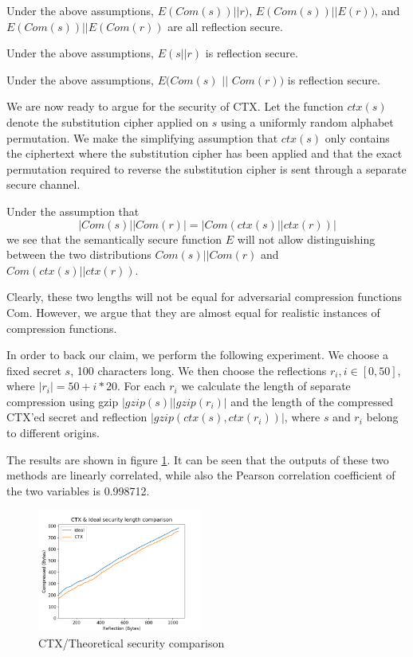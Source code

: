 \begin{lemma}
    Under the above assumptions, $E(Com(s)) || r)$, \break$E(Com(s)) || E(r))$, and
    $E(Com(s)) || E(Com(r))$ are all reflection secure.
\end{lemma}

\begin{lemma}
    Under the above assumptions, $E(s || r)$ is reflection secure.
\end{lemma}

\begin{lemma}
    Under the above assumptions, $E(Com(s)$ $||$ $Com(r))$ is reflection secure.
\end{lemma}

We are now ready to argue for the security of CTX. Let the function $ctx(s)$
denote the substitution cipher applied on $s$ using a uniformly random alphabet
permutation. We make the simplifying assumption that $ctx(s)$ only contains the
ciphertext where the substitution cipher has been applied and that the exact
permutation required to reverse the substitution cipher is sent through a
separate secure channel.

Under the assumption that \[|Com(s) || Com(r)| = |Com(ctx(s) || ctx(r))|\] we
see that the semantically secure function $E$ will not allow distinguishing
between the two distributions $Com(s) || Com(r)$ and $Com(ctx(s) || ctx(r))$.

Clearly, these two lengths will not be equal for adversarial compression
functions Com. However, we argue that they are almost equal for realistic
instances of compression functions.

In order to back our claim, we perform the following experiment. We choose a
fixed secret $s$, 100 characters long. We then choose the reflections $r_i,
i\in[0, 50]$, where $|r_i| = 50 + i*20$. For each $r_i$ we calculate the
length of separate compression using gzip $|gzip(s)||gzip(r_i)|$ and the length
of the compressed CTX'ed secret and reflection $|gzip(ctx(s), ctx(r_i))|$, where $s$
and $r_i$ belong to different origins.

The results are shown in figure \ref{fig:defense_experiment}. It can be seen
that the outputs of these two methods are linearly correlated, while also the
Pearson correlation coefficient of the two variables is 0.998712.

    \begin{figure}[thpb]
        \centering
            \includegraphics[width=0.48\textwidth]{experiments/ctx_idealness/ctx_experiment.png}
        \caption{CTX/Theoretical security comparison}
        \label{fig:defense_experiment}
    \end{figure}
